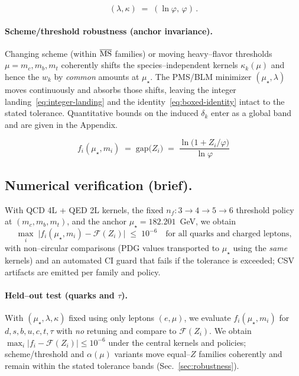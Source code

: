 \documentclass[epjc3]{svjour3}
\begin{document}
\begin{equation}
  (\lambda,\kappa)\;=\;(\ln\varphi,\,\varphi)\,.
  \label{eq:lambda-kappa-values}
\end{equation}

\paragraph{Scheme/threshold robustness (anchor invariance).}
Changing scheme (within $\overline{\rm MS}$ families) or moving heavy--flavor thresholds $\mu=m_c,m_b,m_t$ coherently shifts the species--independent kernels $\kappa_k(\mu)$ and hence the $w_k$ by \emph{common} amounts at $\mu_\star$. The PMS/BLM minimizer $(\mu_\star,\lambda)$ moves continuously and absorbs those shifts, leaving the integer landing~\eqref{eq:integer-landing} and the identity~\eqref{eq:boxed-identity} intact to the stated tolerance. Quantitative bounds on the induced $\delta_k$ enter as a global band and are given in the Appendix.%

\begin{equation}
  \boxed{\quad f_i(\mu_\star,m_i)\;=\;\mathrm{gap}\bigl(Z_i\bigr)\;=\;\frac{\ln\!\bigl(1+Z_i/\varphi\bigr)}{\ln\varphi}\quad}
  \label{eq:boxed-identity}
\end{equation}

\subsection{Numerical verification (brief).}
With QCD 4L + QED 2L kernels, the fixed $n_f:3\!\to\!4\!\to\!5\!\to\!6$ threshold policy at $(m_c,m_b,m_t)$, and the anchor $\mu_\star=182.201$~GeV, we obtain
\begin{equation}
  \max_i\;\bigl|f_i(\mu_\star,m_i)-\mathcal F(Z_i)\bigr|\;\le\;10^{-6}
  \quad\text{for all quarks and charged leptons,}
\end{equation}
with non--circular comparisons (PDG values transported to $\mu_\star$ using the \emph{same} kernels) and an automated CI guard that fails if the tolerance is exceeded; CSV artifacts are emitted per family and policy.%

\paragraph{Held--out test (quarks and $\tau$).}
With $(\mu_\star,\lambda,\kappa)$ fixed using only leptons $(e,\mu)$, we evaluate $f_i(\mu_\star,m_i)$ for $d,s,b,u,c,t,\tau$ with \emph{no} retuning and compare to $\mathcal F(Z_i)$. We obtain $\max_i|f_i-\mathcal F(Z_i)|\le 10^{-6}$ under the central kernels and policies; scheme/threshold and $\alpha(\mu)$ variants move equal--$Z$ families coherently and remain within the stated tolerance bands (Sec.~\ref{sec:robustness}).
\end{document}
